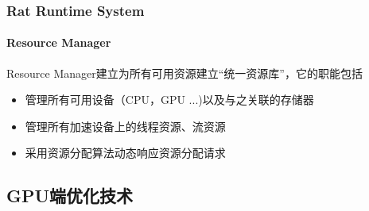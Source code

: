 \documentclass{beamer}
\begin{document}
\begin{frame}
  \frametitle{Rat Runtime System}
  \framesubtitle{Resource Manager}
  Resource Manager建立为所有可用资源建立“统一资源库”，它的职能包括    
  \begin{itemize}
    \item 管理所有可用设备（CPU，GPU ...)以及与之关联的存储器
    \item 管理所有加速设备上的线程资源、流资源
    \item 采用资源分配算法动态响应资源分配请求
  \end{itemize}
\end{frame}



\subsection{GPU端优化技术}
\end{document}
